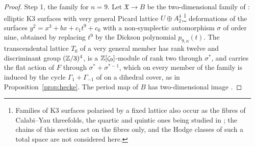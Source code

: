 \begin{proof}
Step 1, the family for $n=9$. Let $\mathfrak{X}\to B$ be the two-dimensional family of \cite[\S5.6]{vGS25}: elliptic K3 surfaces with very general Picard lattice $U\oplus A_{2}^{4}$,\footnote{Families of K3 surfaces polarised by a fixed lattice also occur as the fibres of Calabi--Yau threefolds, the quartic and quintic ones being studied in \cite{Bha22}; the chains of this section act on the fibres only, and the Hodge classes of such a total space are not considered here.} deformations of the surfaces $y^{2}=x^{3}+bx+c_{1}t^{9}+c_{0}$ with a non-symplectic automorphism $\sigma$ of order nine, obtained by replacing $t^{9}$ by the Dickson polynomial $p_{9,a}(t)$. The transcendental lattice $T_{0}$ of a very general member has rank twelve and discriminant group $(\mathbb{Z}/3)^{4}$, is a $\mathbb{Z}[\zeta_{9}]$-module of rank two through $\sigma^{*}$, and carries the flat action of $F$ through $\sigma^{*}+\sigma^{*-1}$, which on every member of the family is induced by the cycle $\Gamma_{1}+\Gamma_{-1}$ of \cite[\S4.8]{vGS25} on a dihedral cover, as in Proposition~\ref{prop:hecke}. The period map of $B$ has two-dimensional image \cite[\S5.6]{vGS25}.


\end{proof}
